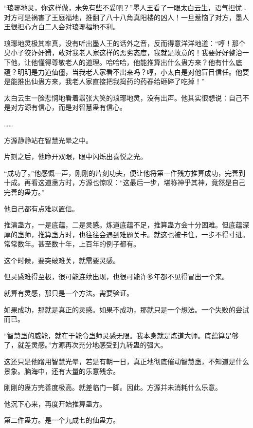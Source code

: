 
\begin{this_body}

“琅琊地灵，你这样做，未免有些不妥吧？”墨人王看了一眼太白云生，语气担忧…对方可是祸害了王庭福地，推翻了八十八角真阳楼的凶人！一旦惹恼了对方，墨人王很担心方白二人会对琅琊福地不利。

琅琊地灵极其率真，没有听出墨人王的话外之音，反而得意洋洋地道：“哼！那个臭小子狡诈奸猾，敢对我老人家这样的恶劣态度，我就是故意的！我要好好整治一下他，让他懂得尊敬老人的道理。哈哈哈，他能推算出什么蛊方来？他有什么底蕴？明明是力道仙僵，当我老人家看不出来吗？哼，小太白是对他盲目信任。他要是能推出仙蛊方来，我老人家直接把我捣药的药舂给砸碎了吃掉！”

太白云生一脸悲悯地看着嚣张大笑的琅琊地灵，没有出声。他其实很想说：自己不是对方源有信心，而是对智慧蛊有信心。

……

方源静静站在智慧光晕之中。

片刻之后，他睁开双眼，眼中闪烁出喜悦之光。

“成功了。”他感慨一声，刚刚的片刻功夫，便让他将第一件残方推算成功，完善到十成。再看这道蛊方时，方源也惊叹：“这最后一步，堪称神乎其神，竟然是自己完善的蛊方。”

他自己都有点难以置信。

推演蛊方，一是底蕴，二是灵感。炼道底蕴不足，推算蛊方会十分困难。但底蕴深厚的蛊师，推算蛊方时，也往往会遇到难题关卡。就这也被卡住，一步不得寸进。常常数年。甚至数十年，上百年的例子都有。

这个时候，要突破难关，就需要灵感。

但灵感难得至极，很可能连续出现，也很可能许多年都不见得冒出一个来。

就算有灵感，那只是一个方法。需要验证。

如果成功，那就是真正的灵感。如果不成功，那就只是一个想法。一个失败的尝试而已。

“智慧蛊的威能，就在于能令蛊师灵感无限。我本身就是炼道大师。底蕴算是够了，就差灵感。”方源再次充分地感受到九转蛊的强大。

这还只是他蹭用智慧光晕，若是有朝一日，真正地彻底催动智慧蛊，不知道是什么景象。脑海中，还有大量的乐意残余。

刚刚的蛊方完善度极高。就差临门一脚。因此。方源并未消耗什么乐意。

他沉下心来，再度开始推算蛊方。

第二件蛊方。是一个九成七的仙蛊方。


\end{this_body}
